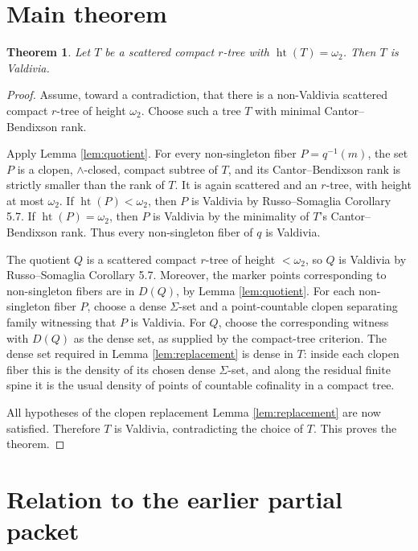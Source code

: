\documentclass[11pt]{article}
\newtheorem{theorem}{Theorem}
\newcommand{\htte}{\operatorname{ht}}
\begin{document}
\section*{Main theorem}

\begin{theorem}\label{thm:main}
Let \(T\) be a scattered compact \(r\)-tree with \(\htte(T)=\omega_2\).  Then
\(T\) is Valdivia.
\end{theorem}

\begin{proof}
Assume, toward a contradiction, that there is a non-Valdivia scattered
compact \(r\)-tree of height \(\omega_2\).  Choose such a tree \(T\) with
minimal Cantor--Bendixson rank.

Apply Lemma \ref{lem:quotient}.  For every non-singleton fiber
\(P=q^{-1}(m)\), the set \(P\) is a clopen, \(\wedge\)-closed, compact
subtree of \(T\), and its Cantor--Bendixson rank is strictly smaller than the
rank of \(T\).  It is again scattered and an \(r\)-tree, with height at most
\(\omega_2\).  If \(\htte(P)<\omega_2\), then \(P\) is Valdivia by
Russo--Somaglia Corollary 5.7.  If \(\htte(P)=\omega_2\), then \(P\) is
Valdivia by the minimality of \(T\)'s Cantor--Bendixson rank.  Thus every
non-singleton fiber of \(q\) is Valdivia.

The quotient \(Q\) is a scattered compact \(r\)-tree of height \(<\omega_2\),
so \(Q\) is Valdivia by Russo--Somaglia Corollary 5.7.  Moreover, the marker
points corresponding to non-singleton fibers are in \(D(Q)\), by
Lemma \ref{lem:quotient}.  For each non-singleton fiber \(P\), choose a dense
\(\Sigma\)-set and a point-countable clopen separating family witnessing that
\(P\) is Valdivia.  For \(Q\), choose the corresponding witness with
\(D(Q)\) as the dense set, as supplied by the compact-tree criterion.
The dense set required in Lemma \ref{lem:replacement} is dense in \(T\):
inside each clopen fiber this is the density of its chosen dense
\(\Sigma\)-set, and along the residual finite spine it is the usual density
of points of countable cofinality in a compact tree.

All hypotheses of the clopen replacement Lemma \ref{lem:replacement} are now
satisfied.  Therefore \(T\) is Valdivia, contradicting the choice of \(T\).
This proves the theorem.
\end{proof}

\section*{Relation to the earlier partial packet}
\end{document}
